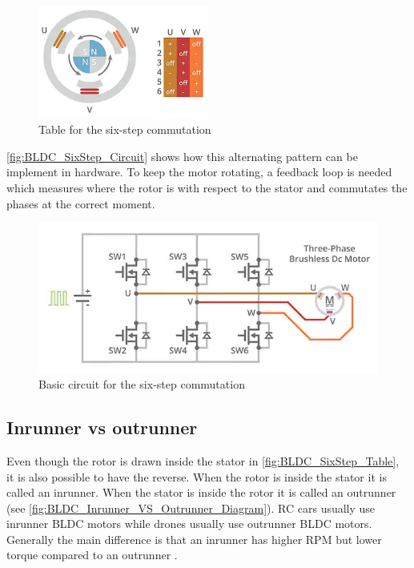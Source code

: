 \documentclass[]{report}
\begin{document}
\begin{figure}[h]
	\centering
	\includegraphics[width=0.5\textwidth]{BLDC_SixStep_Table.jpeg}
	\caption{Table for the six-step commutation \cite{Digikey_BLDC_SixStep}}
	\label{fig:BLDC_SixStep_Table}
\end{figure}

\autoref{fig:BLDC_SixStep_Circuit} shows how this alternating pattern can be implement in hardware. To keep the motor rotating, a feedback loop is needed which measures where the rotor is with respect to the stator and commutates the phases at the correct moment.

\begin{figure}[h]
	\centering
	\includegraphics[width=\textwidth]{BLDC_SixStep_Circuit.jpeg}
	\caption{Basic circuit for the six-step commutation \cite{Digikey_BLDC_SixStep}}
	\label{fig:BLDC_SixStep_Circuit}
\end{figure}

\subsection{Inrunner vs outrunner}

Even though the rotor is drawn inside the stator in \autoref{fig:BLDC_SixStep_Table}, it is also possible to have the reverse. When the rotor is inside the stator it is called an inrunner. When the stator is inside the rotor it is called an outrunner (see \autoref{fig:BLDC_Inrunner_VS_Outrunner_Diagram}). RC cars usually use inrunner BLDC motors while drones usually use outrunner BLDC motors. Generally the main difference is that an inrunner has higher RPM but lower torque compared to an outrunner \cite{BLDC_Inrunner_VS_Outrunner}.
\end{document}
